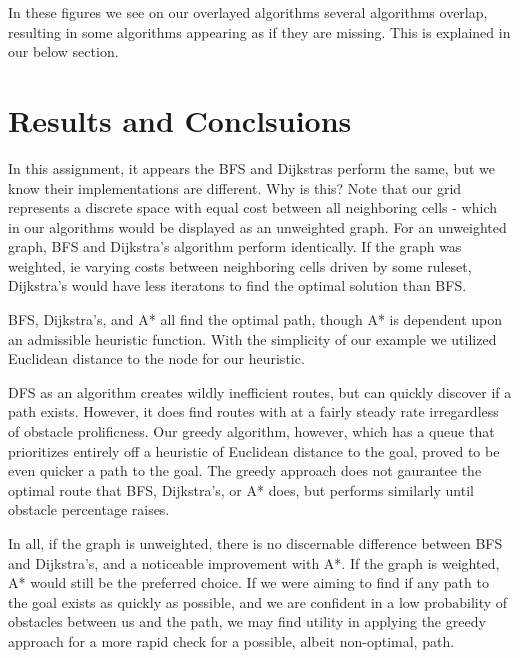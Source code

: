 \documentclass{article}
\begin{document}
In these figures we see on our overlayed algorithms several algorithms overlap, resulting in some algorithms appearing as if they are missing. This is explained in our below section.

\section*{Results and Conclsuions}

In this assignment, it appears the BFS and Dijkstras perform the same, but we know their implementations are different. Why is this? Note that our grid represents a discrete space with equal cost between all neighboring cells - which in our algorithms would be displayed as an unweighted graph. For an unweighted graph, BFS and Dijkstra's algorithm perform identically. If the graph was weighted, ie varying costs between neighboring cells driven by some ruleset, Dijkstra's would have less iteratons to find the optimal solution than BFS.

BFS, Dijkstra's, and A* all find the optimal path, though A* is dependent upon an admissible heuristic function. With the simplicity of our example we utilized Euclidean distance to the node for our heuristic.

DFS as an algorithm creates wildly inefficient routes, but can quickly discover if a path exists. However, it does find routes with at a fairly steady rate irregardless of obstacle prolificness. Our greedy algorithm, however, which has a queue that prioritizes entirely off a heuristic of Euclidean distance to the goal, proved to be even quicker a path to the goal. The greedy approach does not gaurantee the optimal route that BFS, Dijkstra's, or A* does, but performs similarly until obstacle percentage raises.

In all, if the graph is unweighted, there is no discernable difference between BFS and Dijkstra's, and a noticeable improvement with A*. If the graph is weighted, A* would still be the preferred choice. If we were aiming to find if any path to the goal exists as quickly as possible, and we are confident in a low probability of obstacles between us and the path, we may find utility in applying the greedy approach for a more rapid check for a possible, albeit non-optimal, path.
\end{document}
